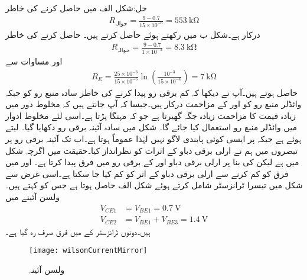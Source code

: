 حل:شکل  الف میں  حاصل کرنے کی خاطر
\begin{align*}
R_{\textrm{حوالہ}}=\frac{9-0.7}{15 \times 10^{-6}}=\SI{553}{\kilo \ohm}
\end{align*}
درکار ہے۔شکل  ب میں  رکھتے ہوئے  حاصل کرتے ہیں۔ حاصل کرنے کی خاطر
\begin{align*}
R_{\textrm{حوالہ}}=\frac{9-0.7}{1 \times 10^{-3}}=\SI{8.3}{\kilo \ohm}
\end{align*}
اور مساوات  سے
\begin{align*}
R_E=\frac{25 \times 10^{-3}}{15 \times 10^{-6}} \ln \left(\frac{10^{-3}}{15 \times 10^{-6}} \right)=\SI{7}{\kilo \ohm}
\end{align*}
حاصل ہوتے ہیں۔آپ نے دیکھا کہ  کم برقی رو پیدا کرنے کی خاطر سادہ منبع رو کو  جبکہ وائڈلر منبع رو کو  اور  کے مزاحمت درکار ہیں۔جیسا کہ آپ جانتے ہیں کہ مخلوط دور میں زیادہ قیمت کا مزاحمت زیادہ جگہ گھیرتا ہے جو کہ مہنگا پڑتا ہے۔اسی لئے مخلوط ادوار میں وائڈلر منبع رو استعمال کیا جائے گا۔
شکل  میں سادہ آئینہ برقی رو دکھایا گیا۔ لیتے ہوئے   ہے جبکہ   پر ایسی کوئی پابندی لاگو نہیں لہٰذا عموماً  ہوتا ہے۔اب تک آئینہ برقی رو پر تبصروں میں ہم نے ارلی برقی دباو کے اثرات کو نظرانداز کیا۔حقیقت میں اگرچہ شکل  میں  ہے لیکن   کی بنا پر ارلی برقی دباو  اور  کے برقی رو میں فرق پیدا کرتا ہے۔ اور  میں فرق کو کم کرنے سے ارلی برقی دباو کے اثر کو کم کیا جا سکتا ہے۔اسی غرض سے شکل  میں تیسرا ٹرانزسٹر شامل کرتے ہوئے شکل  الف حاصل ہوتا ہے جس کو  کہتے ہیں۔ولسن آئینے میں
\begin{align*}
V_{CE1}&=V_{BE1}=\SI{0.7}{\volt}\\
V_{CE2}&=V_{BE1}+V_{BE3}=\SI{1.4}{\volt}
\end{align*}
ہیں۔دونوں ٹرانزسٹر کے  میں فرق صرف  رہ گیا ہے۔
\begin{figure}
\centering
\texttt{[image: wilsonCurrentMirror]}
\caption{ولسن آئینہ}
\label{شکل_تفرقی_ولسن_آئینہ}
\end{figure}
